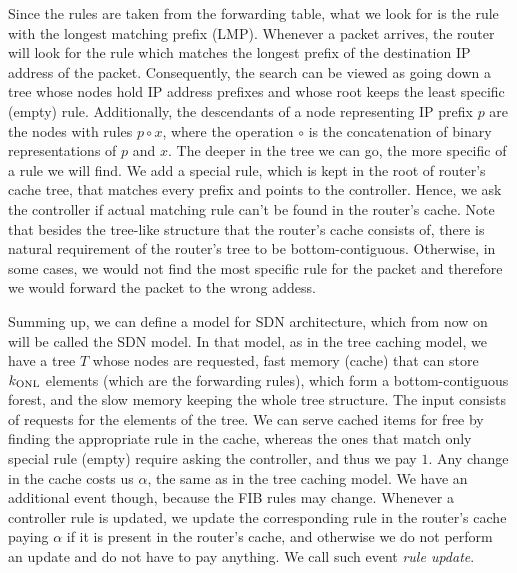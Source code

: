 Since the rules are taken from the forwarding table, what we look for is the
rule with the longest matching prefix (LMP). Whenever a packet arrives, the
router will look for the rule which matches the longest prefix of the
destination IP address of the packet. Consequently, the search can be viewed as
going down a tree whose nodes hold IP address prefixes and whose
root keeps the least specific (empty) rule. Additionally, the descendants of a node
representing IP prefix $p$ are the nodes with rules $p \circ x$, where the operation
$\circ$ is the concatenation of binary representations of $p$ and $x$. The deeper in
the tree we can go, the more specific of a rule we will find. We add a special rule,
which is kept in the root of router's cache tree, that matches every prefix and
points to the controller. Hence, we ask the
controller if actual matching rule can't be found in the router's cache. Note that besides
the tree-like structure that the router's cache
consists of, there is natural requirement of the router's tree to be
bottom-contiguous. Otherwise, in some cases, we would not find the most specific
rule for the packet and therefore we would forward the packet to the wrong addess. 

Summing up, we can define a model for SDN architecture, which from now on will
be called the SDN model. In that model, as in the tree caching model, we have a tree
$T$ whose nodes are requested, fast memory (cache) that can store $k_{\mathrm{ONL}}$
elements (which are the forwarding rules), which form a bottom-contiguous forest,
and the slow memory keeping the whole tree structure. The input consists of
requests for the elements of the tree. We can serve cached items for free by finding
the appropriate rule in the cache, whereas the ones that match only special rule
(empty) require asking the controller, and thus we pay $1$. Any change in the
cache costs us $\alpha$, the same as in the tree caching model. We have an
additional event though, because the FIB rules may change. Whenever a controller
rule is updated, we update the corresponding rule in the router's cache paying
$\alpha$ if it is present in the router's cache, and otherwise we do not perform
an update and do not have to pay anything. We call such event \emph{rule update}.

